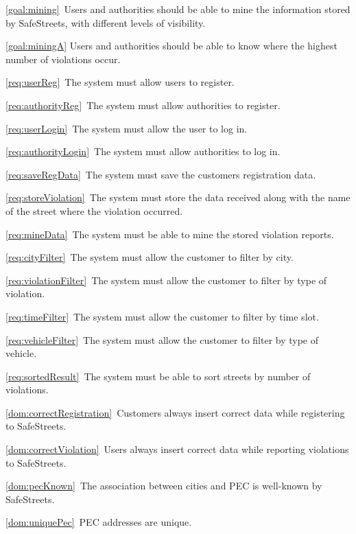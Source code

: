 \begin{description}
			\item \ref{goal:mining}\ Users and authorities should be able to mine the information stored by SafeStreets, with different levels of visibility.
				\begin{description}
					\item \ref{goal:miningA} Users and authorities should be able to know where the highest number of violations occur.
						\begin{description}
							\item \ref{req:userReg}\ The system must allow users to register.
							\item \ref{req:authorityReg}\ The system must allow authorities to register.
							\item \ref{req:userLogin}\ The system must allow the user to log in.
							\item \ref{req:authorityLogin}\ The system must allow authorities to log in.
							\item \ref{req:saveRegData}\ The system must save the customers registration data.
							\item \ref{req:storeViolation}\ The system must store the data received along with the name of the street where the violation occurred.
							\item \ref{req:mineData}\ The system must be able to mine the stored violation reports.
							\item \ref{req:cityFilter}\ The system must allow the customer to filter by city.
							\item \ref{req:violationFilter}\ The system must allow the customer to filter by type of violation.
							\item \ref{req:timeFilter}\ The system must allow the customer to filter by time slot.
							\item \ref{req:vehicleFilter}\ The system must allow the customer to filter by type of vehicle.
							\item \ref{req:sortedResult}\ The system must be able to sort streets by number of violations.
							\item \ref{dom:correctRegistration}\ Customers always insert correct data while registering to SafeStreets.
							\item \ref{dom:correctViolation}\ Users always insert correct data while reporting violations to SafeStreets.
							\item \ref{dom:pecKnown}\ The association between cities and PEC is well-known by SafeStreets.
							\item \ref{dom:uniquePec}\ PEC addresses are unique.

\end{description}
\end{description}
\end{description}
